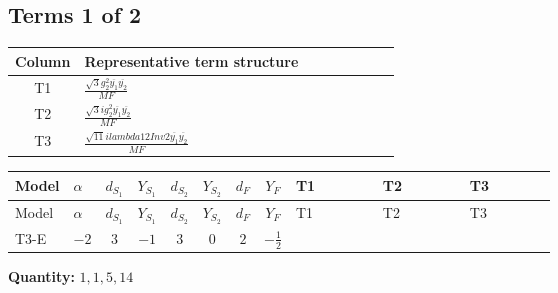 \documentclass[8pt]{article}
\begin{document}
\begin{landscape}
\subsection*{Terms 1 of 2}
\begin{center}
\begin{tabular}{@{}c >{\raggedright\arraybackslash}p{0.82\linewidth}@{}}
\toprule
Column & Representative term structure \\
\midrule
T1 & \(\displaystyle \frac{\sqrt{3} g_{2}^{2} \overline{y_{1}} \overline{y_{2}}}{MF}\) \\
\midrule
T2 & \(\displaystyle \frac{\sqrt{3} i g_{2}^{2} \overline{y_{1}} \overline{y_{2}}}{MF}\) \\
\midrule
T3 & \(\displaystyle \frac{\sqrt{11} i lambda12Inv2 \overline{y_{1}} \overline{y_{2}}}{MF}\) \\
\midrule
\bottomrule
\end{tabular}
\end{center}
\smallskip
\tiny
\begin{longtable}{@{}llcccccc >{\raggedright\arraybackslash}p{0.21\linewidth} >{\raggedright\arraybackslash}p{0.21\linewidth} >{\raggedright\arraybackslash}p{0.21\linewidth}@{}}
\toprule
Model & $\alpha$ & $d_{S_1}$ & $Y_{S_1}$ & $d_{S_2}$ & $Y_{S_2}$ & $d_F$ & $Y_F$ & T1 & T2 & T3 \\
\midrule
\endfirsthead
\toprule
Model & $\alpha$ & $d_{S_1}$ & $Y_{S_1}$ & $d_{S_2}$ & $Y_{S_2}$ & $d_F$ & $Y_F$ & T1 & T2 & T3 \\
\midrule
\endhead
T3-E & $-2$ & $3$ & $-1$ & $3$ & $0$ & $2$ & $-\frac{1}{2}$ & \scriptsize\adjustbox{max width=\linewidth}{$\begin{gathered} \frac{\sqrt{3} g_{2}^{2} \overline{y_{1}} \overline{y_{2}}}{6 MF}\end{gathered}$} & \scriptsize\adjustbox{max width=\linewidth}{$\begin{gathered} - \frac{11 \sqrt{3} i g_{2}^{2} \overline{y_{1}} \overline{y_{2}}}{8 MF}\end{gathered}$} & \scriptsize\adjustbox{max width=\linewidth}{$\begin{gathered} - \frac{3 \sqrt{11} i lambda12Inv2 \overline{y_{1}} \overline{y_{2}}}{22 MF}\end{gathered}$} \\
\midrule
\bottomrule
\end{longtable}
\clearpage
\noindent\textbf{Quantity: }$\mathrm{1,1,5,14}$\par\smallskip

\end{landscape}
\end{document}
